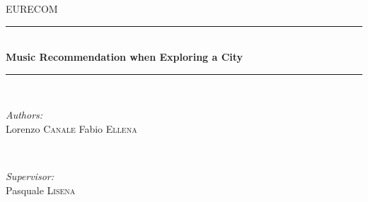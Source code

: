 \begin{titlepage}

\newcommand{\HRule}{\rule{\linewidth}{0.5mm}} %

\center %
 

\textsc{\LARGE EURECOM}\\[1.5cm] %


\HRule \\[0.4cm]
{ \huge \bfseries Music Recommendation when Exploring a City}\\[0.4cm] %
\HRule \\[1.5cm]
 

\begin{minipage}{0.4\textwidth}
\begin{flushleft} \large
\emph{Authors:}\\
Lorenzo \textsc{Canale} %
\newline
Fabio \textsc{Ellena} %
\end{flushleft}
\end{minipage}
~
\begin{minipage}{0.4\textwidth}
\begin{flushright} \large
\emph{Supervisor:} \\
Pasquale \textsc{Lisena} %
\end{flushright}
\end{minipage}\\[2cm]


\end{titlepage}
